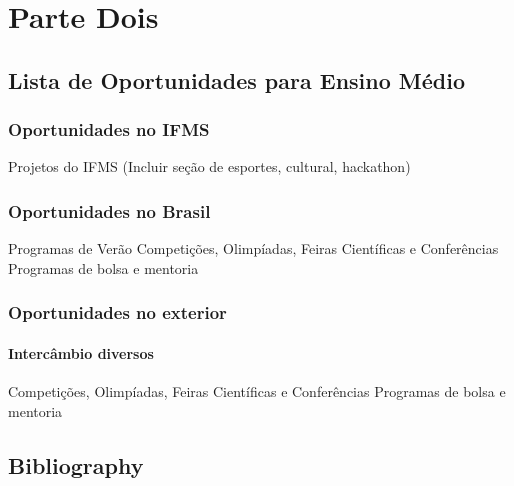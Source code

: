 \documentclass[11pt,fleqn]{book} %
\begin{document}
\part{Parte Dois}



\chapter{Lista de Oportunidades para Ensino Médio}

\section{Oportunidades no IFMS}

Projetos do IFMS (Incluir seção de esportes, cultural, hackathon)


\section{Oportunidades no Brasil}
Programas de Verão
Competições, Olimpíadas, Feiras Científicas e Conferências
Programas de bolsa e mentoria


\section{Oportunidades no exterior}
\subsection{Intercâmbio diversos}
Competições, Olimpíadas, Feiras Científicas e Conferências
Programas de bolsa e mentoria


\chapter*{Bibliography}
\end{document}
